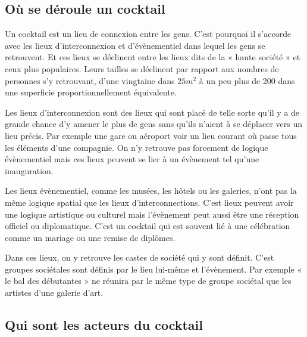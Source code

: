 \subsection{Où se déroule un cocktail}


Un cocktail est un lieu de connexion entre les gens. C’est pourquoi il s’accorde avec les lieux d’interconnexion et d’évènementiel dans lequel les gens se retrouvent. Et ces lieux se déclinent entre les lieux dits de la « haute société » et ceux plus populaires. Leurs tailles se déclinent par rapport aux nombres de personnes s’y retrouvant, d’une vingtaine dans $25m^2$ à un peu plus de 200 dans une superficie proportionnellement équivalente.

Les lieux d’interconnexion sont des lieux qui sont placé de telle sorte qu’il y a de grande chance d’y amener le plus de gens sans qu’ils n’aient à se déplacer vers un lieu précis. Par exemple une gare ou aéroport voir un lieu courant où passe tous les éléments d’une compagnie. On n’y retrouve pas forcement de logique évènementiel mais ces lieux peuvent se lier à un évènement tel qu’une inauguration.

Les lieux évènementiel, comme les musées, les hôtels ou les galeries, n’ont pas la même logique spatial que les lieux d’interconnections.  C’est lieux peuvent avoir une logique artistique ou culturel mais l’évènement peut aussi être une réception officiel ou diplomatique. C’est un cocktail qui est souvent lié à une célébration comme un mariage ou une remise de diplômes.

Dans ces lieux, on y retrouve les castes de société qui y sont définit. C’est groupes sociétales sont définis par le lieu lui-même et l’évènement. Par exemple « le bal des débutantes » ne réunira par le même type de groupe sociétal que les artistes d’une galerie d’art.


\subsection{Qui sont les acteurs du cocktail}

